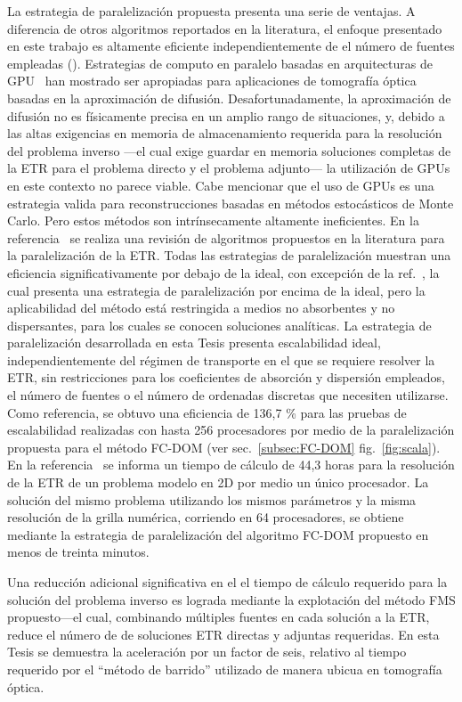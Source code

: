 La estrategia de paralelización propuesta presenta una serie de
ventajas. A diferencia de otros algoritmos reportados en la literatura, el enfoque
presentado en este trabajo es altamente eficiente independientemente de
el número de fuentes empleadas (\cf \cite{Hielscher2004}).
Estrategias de computo en paralelo basadas en arquitecturas de GPU~\cite {Doulgerakis2017} han mostrado ser apropiadas para aplicaciones de tomografía óptica basadas en la aproximación de difusión. Desafortunadamente, 
la aproximación de difusión no es físicamente precisa en un amplio rango de situaciones,
y, debido a las altas exigencias en memoria de almacenamiento requerida para 
la resolución del problema inverso ---el cual exige guardar en memoria soluciones completas 
de la ETR para el problema 
directo y el problema adjunto--- la utilización de GPUs en este contexto no parece viable. 
Cabe mencionar que el uso de GPUs es una estrategia valida para reconstrucciones 
basadas en métodos estocásticos de Monte Carlo. Pero estos métodos son intrínsecamente 
altamente ineficientes. En la 
referencia~\cite{Coelho2014} se realiza una revisión de algoritmos propuestos en la literatura 
para la paralelización de la ETR. Todas las estrategias de paralelización muestran una eficiencia significativamente por debajo de la ideal, con excepción de la ref.~\cite {Colomer2013}, la cual presenta una estrategia de paralelización 
por encima de la ideal, pero
la aplicabilidad del método está restringida a medios no absorbentes y no dispersantes, 
para los cuales se conocen soluciones analíticas. La estrategia de paralelización 
desarrollada en esta Tesis presenta escalabilidad ideal, independientemente 
del régimen de transporte en el que se requiere resolver la ETR, sin restricciones 
para los coeficientes de absorción y dispersión empleados, el número de fuentes o el número de ordenadas discretas que necesiten utilizarse. Como referencia, se obtuvo una eficiencia de 136,7 \% para las pruebas de escalabilidad realizadas con hasta 256 procesadores por
medio de la paralelización propuesta para el método FC-DOM (ver sec.~\ref{subsec:FC-DOM} fig.~\ref{fig:scala}). En la referencia~\cite [p. 153]{Fujii2014} 
se informa un tiempo de cálculo de 44,3 horas para la resolución de la ETR de un problema modelo 
en 2D por medio un único procesador. La solución del mismo problema utilizando 
los mismos parámetros y la misma resolución de la grilla numérica, corriendo en 64 procesadores, se obtiene mediante la estrategia de paralelización del algoritmo FC-DOM propuesto en menos de treinta minutos.

Una reducción adicional significativa en el
el tiempo de cálculo requerido para la solución del problema inverso es
lograda mediante la explotación del método FMS propuesto---el cual, combinando
múltiples fuentes en cada solución a la ETR, reduce el número de
de soluciones ETR directas y adjuntas requeridas. 
En esta Tesis se demuestra la aceleración por un factor de seis, 
relativo al tiempo requerido por el ``método de barrido'' 
utilizado de manera ubicua en tomografía óptica.
 
\pagestyle{empty}

%


